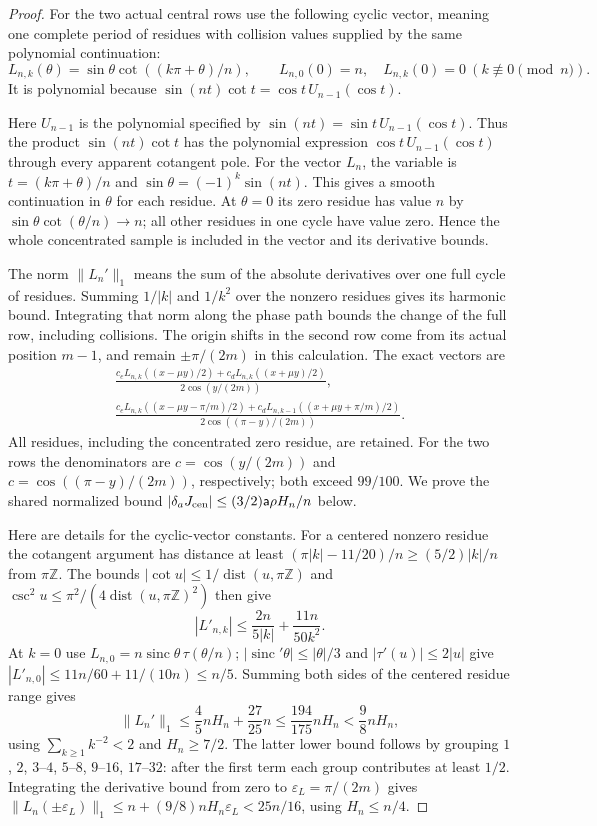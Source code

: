 \begin{proof}
For the two actual central rows use the following cyclic vector,
meaning one complete period of residues with collision values supplied
by the same polynomial continuation:
\[
 L_{n,k}(\theta)=\sin\theta\cot((k\pi+\theta)/n),\qquad
 L_{n,0}(0)=n,\quad L_{n,k}(0)=0\ (k\not\equiv0\pmod n).
\]
It is polynomial because $\sin(nt)\cot t=\cos t\,U_{n-1}(\cos t)$.

Here $U_{n-1}$ is the polynomial specified by
$\sin(nt)=\sin t\,U_{n-1}(\cos t)$. Thus the product
$\sin(nt)\cot t$ has the polynomial expression
$\cos t\,U_{n-1}(\cos t)$ through every apparent cotangent pole.
For the vector $L_n$, the variable is $t=(k\pi+\theta)/n$ and
$\sin\theta=(-1)^k\sin(nt)$. This gives a smooth continuation in
$\theta$ for each residue. At $\theta=0$ its zero residue has
value $n$ by $\sin\theta\cot(\theta/n)\to n$; all other residues
in one cycle have value zero. Hence the whole concentrated sample is
included in the vector and its derivative bounds.

The norm $\|L_n'\|_1$ means the sum of the absolute derivatives over
one full cycle of residues. Summing $1/|k|$ and $1/k^2$ over the
nonzero residues gives its harmonic bound. Integrating that norm along
the phase path bounds the change of the full row, including collisions.
The origin shifts in the second row come from its actual position
$m-1$, and remain $\pm\pi/(2m)$ in this calculation.
The exact vectors are
\[
 \begin{gathered}
 \frac{c_eL_{n,k}((x-\mu y)/2)+c_dL_{n,k}((x+\mu y)/2)}
                {2\cos(y/(2m))},\\
 \frac{c_eL_{n,k}((x-\mu y-\pi/m)/2)
             +c_dL_{n,k-1}((x+\mu y+\pi/m)/2)}
                {2\cos((\pi-y)/(2m))}.
 \end{gathered}
\]
All residues, including the concentrated zero residue, are retained.
For the two rows the denominators are
$c=\cos(y/(2m))$ and $c=\cos((\pi-y)/(2m))$, respectively;
both exceed $99/100$. We prove the shared normalized bound
$|\delta_aJ_{\rm cen}|\leq(3/2)\mathsf a\rho H_n/n$ below.

Here are details for the cyclic-vector constants. For a centered
nonzero residue the cotangent argument has distance at least
$(\pi|k|-11/20)/n\geq(5/2)|k|/n$ from $\pi\mathbb Z$.
The bounds $|\cot u|\leq1/\operatorname{dist}(u,\pi\mathbb Z)$
and $\csc^2u\leq\pi^2/(4\operatorname{dist}(u,\pi\mathbb Z)^2)$
then give
\[
 |L'_{n,k}|\leq\frac{2n}{5|k|}+\frac{11n}{50k^2}.
\]
At $k=0$ use $L_{n,0}=n\operatorname{sinc}\theta\,
\tau(\theta/n)$; $|\operatorname{sinc}'\theta|\leq|\theta|/3$
and $|\tau'(u)|\leq2|u|$ give
$|L'_{n,0}|\leq11n/60+11/(10n)\leq n/5$.
Summing both sides of the centered residue range gives
\[
 \|L_n'\|_1\leq\frac45nH_n+\frac{27}{25}n
 \leq\frac{194}{175}nH_n<\frac98nH_n,
\]
using $\sum_{k\geq1}k^{-2}<2$ and $H_n\geq7/2$.
The latter lower bound follows by grouping $1$, $2$, $3$--$4$,
$5$--$8$, $9$--$16$, $17$--$32$: after the first term each
group contributes at least $1/2$. Integrating the derivative bound
from zero to $\varepsilon_L=\pi/(2m)$ gives
$\|L_n(\pm\varepsilon_L)\|_1\leq n+(9/8)nH_n\varepsilon_L<25n/16$,
using $H_n\leq n/4$.


\end{proof}
